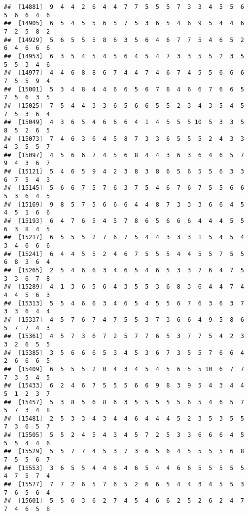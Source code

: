 \documentclass[
]{book}
\begin{document}
\begin{verbatim}
##  [14881]  9  4  4  2  6  4  4  7  7  5  5  5  7  3  3  4  5  5  6  5  6  6  4  6
##  [14905]  6  5  4  5  5  6  5  7  5  3  6  5  4  6  9  5  4  4  6  7  2  5  8  2
##  [14929]  5  6  5  5  5  8  6  3  5  6  4  6  7  7  5  4  6  5  2  6  4  6  6  6
##  [14953]  6  3  5  4  5  4  5  6  4  5  4  7  3  3  5  5  2  3  5  5  5  3  4  6
##  [14977]  4  4  6  8  8  6  7  4  4  7  4  6  7  4  5  5  6  6  6  7  5  5  9  4
##  [15001]  5  3  4  8  4  4  6  6  5  6  7  8  4  6  6  7  6  6  5  7  5  6  3  5
##  [15025]  7  5  4  4  3  3  6  5  6  6  5  5  2  3  4  3  5  4  5  7  5  3  6  4
##  [15049]  4  3  6  5  4  6  6  6  4  1  4  5  5  5 10  5  3  3  5  8  5  2  6  5
##  [15073]  7  4  6  3  6  4  5  8  7  3  3  6  5  5  5  2  4  3  3  4  3  5  5  7
##  [15097]  4  5  6  6  7  4  5  6  8  4  4  3  6  3  6  4  6  5  7  9  4  3  6  7
##  [15121]  5  4  6  5  9  4  2  3  8  3  8  6  5  6  5  5  6  3  3  6  7  5  4  3
##  [15145]  5  6  6  7  5  7  6  3  7  5  4  6  7  6  7  5  5  6  6  5  3  6  4  5
##  [15169]  9  8  5  7  5  6  6  6  4  4  8  7  3  3  3  6  6  4  5  4  5  1  6  6
##  [15193]  6  4  7  6  5  4  5  7  8  6  5  6  6  6  4  4  4  5  5  6  3  8  4  5
##  [15217]  6  5  5  5  2  7  6  7  5  4  4  3  3  3  1  5  4  5  4  3  4  6  6  6
##  [15241]  6  4  4  5  5  2  4  6  7  5  5  5  4  4  5  5  7  5  5  6  8  3  6  4
##  [15265]  2  5  4  6  6  3  4  6  5  4  6  5  3  3  7  6  4  7  5  3  3  6  7  8
##  [15289]  4  1  3  6  5  6  4  3  5  5  3  6  8  3  6  4  4  7  4  4  4  5  6  3
##  [15313]  5  5  4  6  6  3  4  6  5  4  5  5  6  7  6  3  6  3  7  3  3  6  4  4
##  [15337]  4  5  7  6  7  4  7  5  5  3  7  3  6  6  4  9  5  8  6  5  7  7  4  3
##  [15361]  4  5  7  3  6  7  2  5  7  7  6  5  3  7  7  5  4  2  3  3  2  6  5  5
##  [15385]  3  5  6  6  6  5  3  4  5  3  6  7  3  5  5  7  6  6  4  2  6  6  6  5
##  [15409]  6  5  5  5  2  0  4  3  4  5  4  5  6  5  5 10  6  7  7  7  3  5  4  5
##  [15433]  6  2  4  6  7  5  5  5  6  6  9  8  3  9  5  4  3  4  4  5  1  2  3  7
##  [15457]  5  3  8  5  6  8  6  3  5  5  5  5  5  6  5  4  6  5  7  5  7  3  4  8
##  [15481]  2  5  3  3  4  3  4  4  6  4  4  4  5  2  3  5  3  5  5  7  3  6  5  7
##  [15505]  5  5  2  4  5  4  3  4  5  7  2  5  3  3  6  6  6  4  5  5  5  4  4  6
##  [15529]  5  5  7  7  4  5  3  7  3  6  5  6  4  5  5  5  5  6  8  7  5  5  6  7
##  [15553]  3  6  5  5  4  4  6  4  6  5  4  4  6  6  5  5  5  5  5  4  7  5  7  4
##  [15577]  7  7  2  6  5  7  6  5  2  6  6  5  4  4  3  4  5  5  3  7  6  5  6  4
##  [15601]  5  5  6  3  6  2  7  4  5  4  6  6  2  5  2  6  2  4  7  7  4  6  5  8

\end{verbatim}
\end{document}

